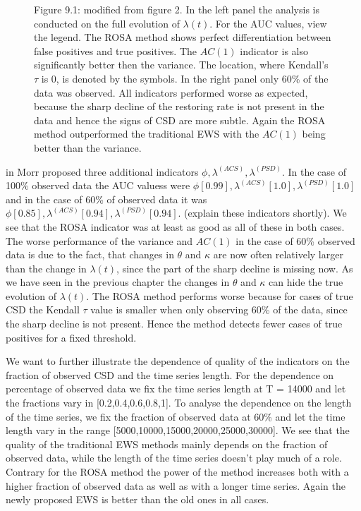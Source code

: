 \documentclass[%
thesis=student,%
coverpage=false,%
titlepage=false,%
headmarks=true, %
german,%
font=libertine, %
math=newpxtx, %
BCOR=5mm,%
coverBCOR=11mm%
]{tumbook}
\begin{document}
\begin{figure}[h!]
    \centering
    \begin{minipage}[b]{0.9\textwidth}
        \centering     
        Figure 9.1: modified from \cite{Morr:2024} figure 2. In the left panel the analysis is conducted on the full evolution of $\lambda(t)$. For the AUC values, view the legend. The ROSA method shows perfect differentiation between false positives and true positives. The $AC(1)$ indicator is also significantly better then the variance. The location, where Kendall's $\tau$ is 0, is denoted by the symbols. In the right panel only 60\% of the data was observed. All indicators performed worse as expected, because the sharp decline of the restoring rate is not present in the data and hence the signs of CSD are more subtle. Again the ROSA method outperformed the traditional EWS with the $AC(1)$ being better than the variance.
    \end{minipage}
    \label{fig:figure 9.1}
\end{figure}

in \cite{Morr:2024} Morr proposed three additional indicators $\phi,\lambda^{(ACS)},\lambda^{(PSD)}$. In the case of 100\% observed data the AUC valuess were $\phi [0.99], \lambda^{(ACS)} [1.0], \lambda^{(PSD)} [1.0]$ and in the case of 60\% of observed data it was  $\phi [0.85], \lambda^{(ACS)} [0.94], \lambda^{(PSD)} [0.94]$. (explain these indicators shortly). We see that the ROSA indicator was at least as good as all of these in both cases.
The worse performance of the variance and $AC(1)$ in the case of 60\% observed data is due to the fact, that changes in $\theta$ and $\kappa$ are now often relatively larger than the change in $\lambda(t)$, since the part of the sharp decline is missing now. As we have seen in the previous chapter the changes in $\theta$ and $\kappa$ can hide the true evolution of $\lambda(t)$. The ROSA method performs worse because for cases of true CSD the Kendall $\tau$ value is smaller when only observing 60\% of the data, since the sharp decline is not present. Hence the method detects fewer cases of true positives for a fixed threshold.

We want to further illustrate the dependence of  quality of the indicators on the fraction of observed CSD and the time series length. For the dependence on percentage of observed data we fix the time series length at T = 14000 and let the fractions vary in [0.2,0.4,0.6,0.8,1]. To analyse the dependence on the length of the time series, we fix the fraction of observed data at 60\% and let the time length vary in the range [5000,10000,15000,20000,25000,30000]. We see that the quality of the traditional EWS methods mainly depends on the fraction of observed data, while the length of the time series doesn't play much of a role. Contrary for the ROSA method the power of the method increases both with a higher fraction of observed data as well as with a longer time series. Again the newly proposed EWS is better than the old ones in all cases. 
\end{document}
